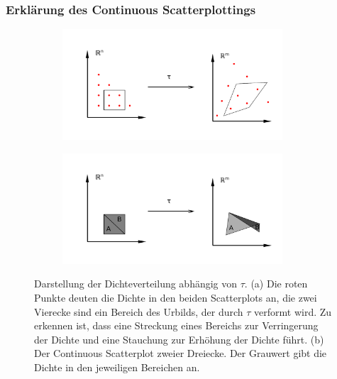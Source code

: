 \documentclass[a4paper,fontsize=12pt,toc=bib,halfparskip]{scrartcl}
\begin{document}
\subsubsection{Erkl\"arung des Continuous Scatterplottings}
\begin{figure}
	\centering
	\begin{subfigure}{0.45\textwidth}
		\includegraphics[width=0.9\textwidth]{pictures/ContinuousScatterplot}
		\subcaption{}
	\end{subfigure}
	\begin{subfigure}{0.45\textwidth}
		\includegraphics[width=0.9\textwidth]{pictures/Case2}
		\subcaption{}
		\label{Case2}
	\end{subfigure}
	\caption{Darstellung der Dichteverteilung abh\"angig von $\tau$. (a) Die roten Punkte deuten die Dichte in den beiden Scatterplots an, die zwei Vierecke sind ein Bereich des Urbilds, der durch $\tau$ verformt wird. Zu erkennen ist, dass eine Streckung eines Bereichs zur Verringerung der Dichte und eine Stauchung zur Erh\"ohung der Dichte f\"uhrt. (b) Der Continuous Scatterplot zweier Dreiecke. Der Grauwert gibt die Dichte in den jeweiligen Bereichen an. }
	\label{ContinuousScatterplot}
\end{figure}
\end{document}
